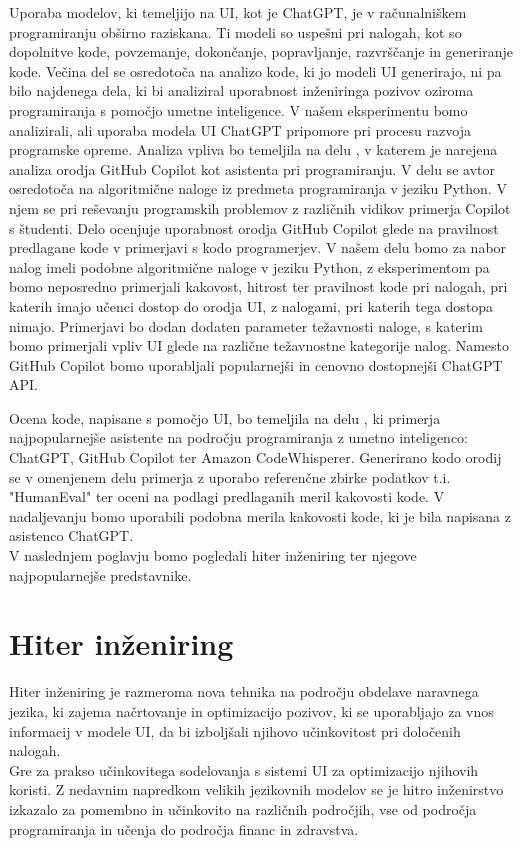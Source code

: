 \documentclass[a4paper,12pt,openright]{book}
\begin{document}
Uporaba modelov, ki temeljijo na UI, kot je ChatGPT, je v računalniškem programiranju obširno raziskana. Ti modeli so uspešni pri nalogah, kot so dopolnitve kode, povzemanje, dokončanje, popravljanje, razvrščanje in generiranje kode. \cite{rudolph2023war} Večina del se osredotoča na analizo kode, ki jo modeli UI generirajo, ni pa bilo najdenega dela, ki bi analiziral uporabnost inženiringa pozivov oziroma programiranja s pomočjo umetne inteligence. V našem eksperimentu bomo analizirali, ali uporaba modela UI ChatGPT pripomore pri procesu razvoja programske opreme.
\newline
Analiza vpliva bo temeljila na delu \cite{MORADIDAKHEL2023111734}, v katerem je narejena analiza orodja GitHub Copilot kot asistenta pri programiranju. V delu se avtor osredotoča na algoritmične naloge iz predmeta programiranja v jeziku Python. V njem se pri reševanju programskih problemov z različnih vidikov primerja Copilot s študenti. Delo ocenjuje uporabnost orodja GitHub Copilot glede na pravilnost predlagane kode v primerjavi s kodo programerjev.
V našem delu bomo za nabor nalog imeli podobne algoritmične naloge v jeziku Python, z eksperimentom pa bomo neposredno primerjali kakovost, hitrost ter pravilnost kode pri nalogah, pri katerih imajo učenci dostop do orodja UI, z nalogami, pri katerih tega dostopa nimajo. Primerjavi bo dodan dodaten parameter težavnosti naloge, s katerim bomo primerjali vpliv UI glede na različne težavnostne kategorije nalog. Namesto GitHub Copilot bomo uporabljali popularnejši in cenovno dostopnejši ChatGPT API. 

Ocena kode, napisane s pomočjo UI, bo temeljila na delu \cite{yetistiren2023evaluating}, ki primerja najpopularnejše asistente na področju programiranja z umetno inteligenco: ChatGPT, GitHub Copilot ter Amazon CodeWhisperer. Generirano kodo orodij se v omenjenem delu primerja z uporabo referenčne zbirke podatkov t.i. "HumanEval" ter oceni na podlagi predlaganih meril kakovosti kode. V nadaljevanju bomo uporabili podobna merila kakovosti kode, ki je bila napisana z asistenco ChatGPT. \cite{7577432} \\
V naslednjem poglavju bomo pogledali hiter inženiring ter njegove najpopularnejše predstavnike.


\chapter{Hiter inženiring}

Hiter inženiring je razmeroma nova tehnika na področju obdelave naravnega jezika, ki zajema načrtovanje in optimizacijo pozivov, ki se uporabljajo za vnos informacij v modele UI, da bi izboljšali njihovo učinkovitost pri določenih nalogah. \cite{wang2024prompt} \\
Gre za prakso učinkovitega sodelovanja s sistemi UI za optimizacijo njihovih koristi. Z nedavnim napredkom velikih jezikovnih modelov se je hitro inženirstvo izkazalo za pomembno in učinkovito na različnih področjih, vse od področja programiranja in učenja do področja financ in zdravstva. \cite{info:doi/10.2196/50638} \\
\end{document}
